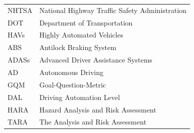 \documentclass[a4paper,12pt]{article}
\begin{document}
\begin{center}
\begin{longtable}{|l|l|}
NHTSA & National Highway Traffic Safety Administration \\

DOT & Department of Transportation \\

HAVs & Highly Automated Vehicles \\

ABS & Antilock Braking System \\

ADASs & Advanced Driver Assistance Systems \\

AD & Autonomous Driving \\

GQM & Goal-Question-Metric \\

DAL & Driving Automation Level  \\

HARA & Hazard Analysis and Risk Assessment  \\

TARA & The Analysis and Risk Assessment   \\

\end{longtable}
\end{center}
\end{document}
